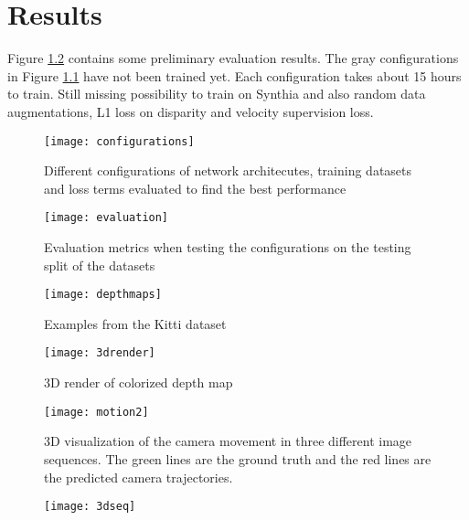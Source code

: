 \chapter{Results}\label{cha:results}

Figure \ref{fig:evaluation} contains some preliminary evaluation results. The gray configurations in Figure \ref{fig:configurations} have not been trained yet. Each configuration takes about 15 hours to train. Still missing possibility to train on Synthia and also random data augmentations, L1 loss on disparity and velocity supervision loss.

\begin{figure}[H]
	\centering
	\texttt{[image: configurations]}
	\caption{Different configurations of network architecutes, training datasets and loss terms evaluated to find the best performance}
	\label{fig:configurations}
\end{figure}

\begin{figure}[H]
	\centering
	\texttt{[image: evaluation]}
	\caption{Evaluation metrics when testing the configurations on the testing split of the datasets}
	\label{fig:evaluation}
\end{figure}

\clearpage

\begin{figure}[H]
	\centering
	\texttt{[image: depthmaps]}
	\caption{Examples from the Kitti dataset}
	\label{fig:depthmapskitty}
\end{figure}


\begin{figure}[H]
	\centering
	\texttt{[image: 3drender]}
	\caption{3D render of colorized depth map}
	\label{fig:3drender}
\end{figure}

\begin{figure}[H]
	\centering
	\texttt{[image: motion2]}
	\caption{3D visualization of the camera movement in three different image sequences. The green lines are the ground truth and the red lines are the predicted camera trajectories.}
	\label{fig:movement}
\end{figure}

\begin{figure}[H]
	\centering
	\texttt{[image: 3dseq]}
	\caption{}
	\label{fig:3dseq}
\end{figure}